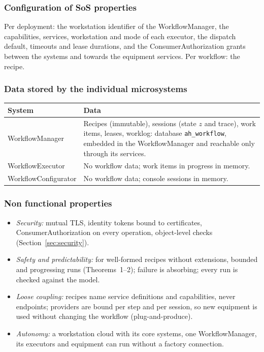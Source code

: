 \documentclass[a4paper]{arrowhead}
\begin{document}
\subsubsection{Configuration of SoS properties}
Per deployment: the workstation identifier of the WorkflowManager, the capabilities, services, workstation and mode of
each executor, the dispatch default, timeouts and lease durations, and the ConsumerAuthorization grants between the
systems and towards the equipment services. Per workflow: the recipe.
\subsubsection{Data stored by the individual microsystems}

{\small
\begin{longtable}{|p{4.0cm}|p{11.8cm}|}

\hline
\rowcolor{gray!33} System & Data \\ \hline
\endhead
WorkflowManager & Recipes (immutable), sessions (state $z$ and trace), work items, leases, worklog: database \texttt{ah\_workflow}, embedded in the WorkflowManager and reachable only through its services. \\ \hline
WorkflowExecutor & No workflow data; work items in progress in memory. \\ \hline
WorkflowConfigurator & No workflow data; console sessions in memory. \\ \hline
\end{longtable}
}

\subsubsection{Non functional properties}
\begin{itemize}
\item \emph{Security:} mutual TLS, identity tokens bound to certificates, ConsumerAuthorization on every operation,
object-level checks (Section~\ref{sec:security}).
\item \emph{Safety and predictability:} for well-formed recipes without extensions, bounded and progressing runs
(Theorems~1--2); failure is absorbing; every run is checked against the model.
\item \emph{Loose coupling:} recipes name service definitions and capabilities, never endpoints; providers are bound
per step and per session, so new equipment is used without changing the workflow (plug-and-produce).
\item \emph{Autonomy:} a workstation cloud with its core systems, one WorkflowManager, its executors and equipment can
run without a factory connection.
\end{itemize}
\end{document}
